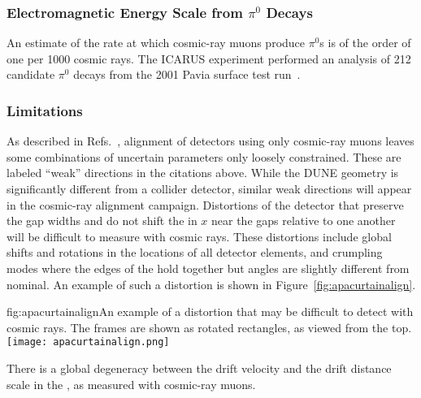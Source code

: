 \subsubsection{Electromagnetic Energy Scale from $\pi^0$ Decays}

An estimate of the rate at which cosmic-ray muons produce $\pi^0$s is of the order of one per \num{1000}
cosmic rays.  The ICARUS experiment performed an analysis of \num{212} candidate $\pi^0$ decays
from the 2001 Pavia surface test run~\cite{Ankowski:2008aa}. 


\subsubsection{Limitations}

As described in Refs.~\cite{LacuestaMiquel:2015ksh,Moles-Valls:2014wza}, alignment of detectors using
only cosmic-ray muons leaves some combinations of uncertain parameters only loosely constrained.
These are labeled ``weak'' directions in the citations above.  While the DUNE \fardet geometry is
significantly different from a collider detector, similar weak directions will appear in the cosmic-ray
alignment campaign.  Distortions of the detector that preserve the gap widths and do not shift
the  in $x$ near the gaps relative to one another will be difficult to measure with cosmic rays.
These distortions include global shifts and rotations in the locations of all detector elements,
and crumpling modes where the edges of the  hold together but angles are slightly different
from nominal.  An example of such a distortion is shown in Figure~\ref{fig:apacurtainalign}. 

\begin{dunefigure}{fig:apacurtainalign}{An example of a distortion that may be difficult to detect with cosmic rays.  The  frames are shown as
rotated rectangles, as viewed from the top.}
\texttt{[image: apacurtainalign.png]}
\end{dunefigure}

There is a global degeneracy between the drift velocity and the drift distance scale in the ,
as measured with cosmic-ray muons.

